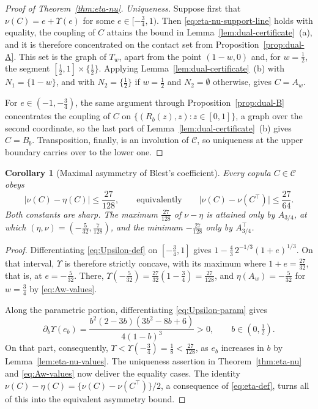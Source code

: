 \documentclass[11pt,a4paper]{article}
\newtheorem{corollary}[theorem]{Corollary}
\theoremstyle{remark}
\newcommand{\1}{\mathbf{1}}
\newcommand{\CC}{\mathcal{C}}
\begin{document}
\begin{proof}[Proof of Theorem~\ref{thm:eta-nu}]
\smallskip\noindent\emph{Uniqueness.}\quad
Suppose first that $\nu(C)=e+\Upsilon(e)$ for some $e\in[-\frac34,1)$.
Then \eqref{eq:eta-nu-support-line} holds with equality, the coupling of $C$ attains the bound in Lemma~\ref{lem:dual-certificate}~(a), and it is therefore concentrated on the contact set from Proposition~\ref{prop:dual-A}.
This set is the graph of $T_w$, apart from the point $(1-w,0)$ and, for $w=\frac12$, the segment $[\frac12,1]\times\{\frac12\}$.
Applying Lemma~\ref{lem:dual-certificate}~(b) with $N_1=\{1-w\}$, and with $N_2=\{\frac12\}$ if $w=\frac12$ and $N_2=\emptyset$ otherwise, gives $C=A_w$.

For $e\in(-1,-\frac34)$, the same argument through Proposition~\ref{prop:dual-B} concentrates the coupling of $C$ on $\{(R_b(z),z):z\in[0,1]\}$, a graph over the second coordinate, so the last part of Lemma~\ref{lem:dual-certificate}~(b) gives $C=B_b$.
Transposition, finally, is an involution of $\CC$, so uniqueness at the upper boundary carries over to the lower one.
\end{proof}

\begin{corollary}[Maximal asymmetry of Blest's coefficient]
\label{cor:asymmetry}
Every copula $C\in\CC$ obeys
\[
  |\nu(C)-\eta(C)|\le\frac{27}{128},
  \qquad\text{equivalently}\qquad
  \bigl|\nu(C)-\nu(C^\top)\bigr|\le\frac{27}{64}.
\]
Both constants are sharp.
The maximum $\frac{27}{128}$ of $\nu-\eta$ is attained only by $A_{3/4}$, at which $(\eta,\nu)=(-\frac{5}{32},\frac{7}{128})$, and the minimum $-\frac{27}{128}$ only by $A_{3/4}^\top$.
\end{corollary}

\begin{proof}
Differentiating \eqref{eq:Upsilon-def} on $[-\frac34,1]$ gives $1-\frac43\,2^{-1/3}(1+e)^{1/3}$.
On that interval, $\Upsilon$ is therefore strictly concave, with its maximum where $1+e=\frac{27}{32}$, that is, at $e=-\frac{5}{32}$.
There, $\Upsilon(-\frac{5}{32})=\frac{27}{32}(1-\frac34)=\frac{27}{128}$, and $\eta(A_w)=-\frac{5}{32}$ for $w=\frac34$ by \eqref{eq:Aw-values}.

Along the parametric portion, differentiating \eqref{eq:Upsilon-param} gives
\[
  \partial_b\Upsilon(e_b)
  =\frac{b^2(2-3b)(3b^2-8b+6)}{4(1-b)^3}>0,
  \qquad b\in(0,\tfrac12).
\]
On that part, consequently, $\Upsilon<\Upsilon(-\frac34)=\frac18<\frac{27}{128}$, as $e_b$ increases in $b$ by Lemma~\ref{lem:eta-nu-values}.
The uniqueness assertion in Theorem~\ref{thm:eta-nu} and \eqref{eq:Aw-values} now deliver the equality cases.
The identity $\nu(C)-\eta(C)=\{\nu(C)-\nu(C^\top)\}/2$, a consequence of \eqref{eq:eta-def}, turns all of this into the equivalent asymmetry bound.
\end{proof}
\end{document}
